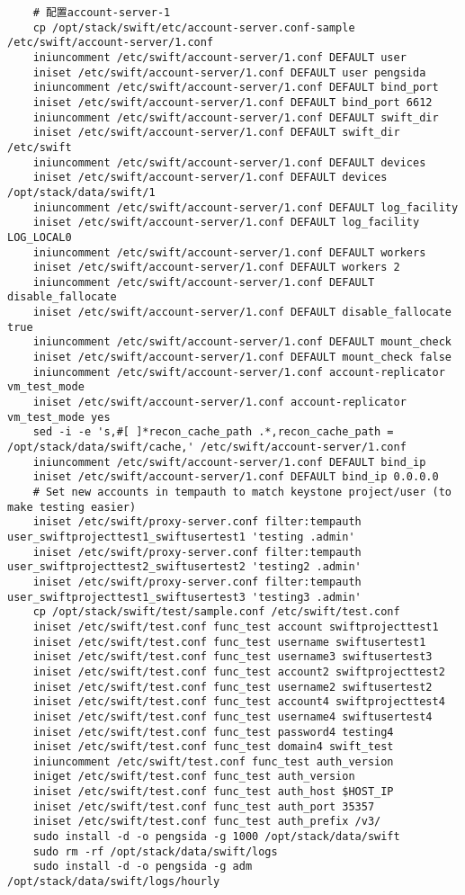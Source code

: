 \documentclass[a4paper,left=1.5cm,right=1.5cm,11pt]{article}
\begin{document}
\begin{lstlisting}
	# 配置account-server-1
	cp /opt/stack/swift/etc/account-server.conf-sample /etc/swift/account-server/1.conf
	iniuncomment /etc/swift/account-server/1.conf DEFAULT user
    iniset /etc/swift/account-server/1.conf DEFAULT user pengsida
    iniuncomment /etc/swift/account-server/1.conf DEFAULT bind_port
    iniset /etc/swift/account-server/1.conf DEFAULT bind_port 6612
    iniuncomment /etc/swift/account-server/1.conf DEFAULT swift_dir
    iniset /etc/swift/account-server/1.conf DEFAULT swift_dir /etc/swift
    iniuncomment /etc/swift/account-server/1.conf DEFAULT devices
    iniset /etc/swift/account-server/1.conf DEFAULT devices /opt/stack/data/swift/1
    iniuncomment /etc/swift/account-server/1.conf DEFAULT log_facility
    iniset /etc/swift/account-server/1.conf DEFAULT log_facility LOG_LOCAL0
    iniuncomment /etc/swift/account-server/1.conf DEFAULT workers
    iniset /etc/swift/account-server/1.conf DEFAULT workers 2
    iniuncomment /etc/swift/account-server/1.conf DEFAULT disable_fallocate
    iniset /etc/swift/account-server/1.conf DEFAULT disable_fallocate true
    iniuncomment /etc/swift/account-server/1.conf DEFAULT mount_check
    iniset /etc/swift/account-server/1.conf DEFAULT mount_check false
    iniuncomment /etc/swift/account-server/1.conf account-replicator vm_test_mode
    iniset /etc/swift/account-server/1.conf account-replicator vm_test_mode yes
    sed -i -e 's,#[ ]*recon_cache_path .*,recon_cache_path = /opt/stack/data/swift/cache,' /etc/swift/account-server/1.conf
    iniuncomment /etc/swift/account-server/1.conf DEFAULT bind_ip
    iniset /etc/swift/account-server/1.conf DEFAULT bind_ip 0.0.0.0
	# Set new accounts in tempauth to match keystone project/user (to make testing easier)
	iniset /etc/swift/proxy-server.conf filter:tempauth user_swiftprojecttest1_swiftusertest1 'testing .admin'
    iniset /etc/swift/proxy-server.conf filter:tempauth user_swiftprojecttest2_swiftusertest2 'testing2 .admin'
    iniset /etc/swift/proxy-server.conf filter:tempauth user_swiftprojecttest1_swiftusertest3 'testing3 .admin'
	cp /opt/stack/swift/test/sample.conf /etc/swift/test.conf
    iniset /etc/swift/test.conf func_test account swiftprojecttest1
    iniset /etc/swift/test.conf func_test username swiftusertest1
    iniset /etc/swift/test.conf func_test username3 swiftusertest3
    iniset /etc/swift/test.conf func_test account2 swiftprojecttest2
    iniset /etc/swift/test.conf func_test username2 swiftusertest2
    iniset /etc/swift/test.conf func_test account4 swiftprojecttest4
    iniset /etc/swift/test.conf func_test username4 swiftusertest4
    iniset /etc/swift/test.conf func_test password4 testing4
    iniset /etc/swift/test.conf func_test domain4 swift_test
	iniuncomment /etc/swift/test.conf func_test auth_version
	iniget /etc/swift/test.conf func_test auth_version
	iniset /etc/swift/test.conf func_test auth_host $HOST_IP
    iniset /etc/swift/test.conf func_test auth_port 35357
    iniset /etc/swift/test.conf func_test auth_prefix /v3/
	sudo install -d -o pengsida -g 1000 /opt/stack/data/swift
	sudo rm -rf /opt/stack/data/swift/logs
	sudo install -d -o pengsida -g adm /opt/stack/data/swift/logs/hourly


\end{lstlisting}
\end{document}
